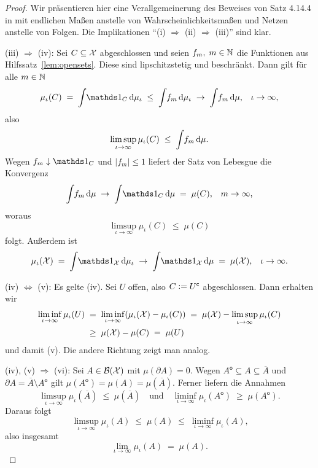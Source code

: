 \documentclass[../main/main.tex]{subfiles}
\begin{document}
	\begin{proof}
		Wir präsentieren hier eine Verallgemeinerung des Beweises von Satz 4.14.4 in \cite[Kapitel 4.14]{Simon.2015} mit endlichen Maßen 
		anstelle von Wahrscheinlichkeitsmaßen und Netzen anstelle von Folgen. Die Implikationen \enquote{(i) $\Rightarrow$ (ii) $\Rightarrow$ (iii)} sind klar. 
		
		(iii) $\Rightarrow$ (iv): Sei $C \subseteq \mathcal{X}$ abgeschlossen und seien 
		$f_m, \; m \in \mathbb{N}$ die Funktionen aus Hilfssatz~\ref{lem:opensets}. 
		Diese sind lipschitzstetig und beschränkt.
		Dann gilt für alle $m \in \mathbb{N}$
		$$\mu_\iota(C) \; = \; \measureint{}{\indfct_C}{\mu_\iota} \; \leq \; 
		\measureint{}{f_m}{\mu_\iota} \; \to \;
		\measureint{}{f_m}{\mu} \text{,} \quad \iota \to \infty \text{,}$$
		also 
		$$\limsup_{\iota \to \infty} \mu_\iota(C) \; \leq \; 
		\int_{} \, f_m \, \mathrm{d}\mu \text{.}$$
		Wegen $f_m \convdown \indfct_C$ und $| f_m | \leq 1$ 
		liefert der Satz von Lebesgue die Konvergenz
		$$\measureint{}{f_m}{\mu} \; \to \;
		\measureint{}{\indfct_C}{\mu} \; = \; \mu(C) \text{,} 
		\quad m \to \infty \text{,}$$
		woraus
		$$\limsup_{\iota \to \infty} \mu_\iota(C) \; \leq \; \mu(C)$$
		folgt. Außerdem ist 
		$$\mu_\iota(\X) \; = \; \measureint{}{\indfct_{\X}}{\mu_\iota} \; \to \; \measureint{}{\indfct_{\X}}{\mu} \; = \; \mu(\X) \text{,} 
		\quad \iota \to \infty \text{.}$$
		
		(iv) $\Leftrightarrow$ (v): Es gelte (iv). Sei $U$ offen, also 
		$C \vcentcolon = U^\mathsf{c}$ abgeschlossen. Dann erhalten wir
		\begin{align*}
			\liminf_{\iota \to \infty} \mu_\iota(U) \; &= \; \liminf_{\iota \to \infty} (\mu_\iota(\mathcal{X}) - \mu_\iota(C)) \; = \;
			\mu(\mathcal{X}) - \limsup_{\iota \to \infty} \mu_\iota(C) \\
			&\geq \; 
			\mu(\mathcal{X}) - \mu(C) \; = \; \mu(U)
		\end{align*}
		und damit (v). Die andere Richtung zeigt man analog.
		
		(iv), (v) $\Rightarrow$ (vi): Sei $A \in \mathcal{B}(\mathcal{X})$ mit 
		$\mu(\partial A) = 0$. Wegen
		$A^\mathsf{o} \subseteq A \subseteq \overline{A}$ und 
		$\partial A = \overline{A} \setminus A^\mathsf{o}$ gilt $\mu(A^\mathsf{o}) = 
		\mu(A) = \mu(\overline{A}) \text{.}$
		Ferner liefern die Annahmen
		$$\limsup_{\iota \to \infty} \mu_\iota(\overline{A}) \; \leq \; 
		\mu(\overline{A}) \quad \text{und} \quad 
		\liminf_{\iota \to \infty} \mu_\iota(A^\mathsf{o}) \; \geq \; 
		\mu(A^\mathsf{o}) \text{.}$$
		Daraus folgt
		$$\limsup_{\iota \to \infty} \mu_\iota(A) \; \leq \; 
		\mu(A) \; \leq \; \liminf_{\iota \to \infty} \mu_\iota(A) \text{,}$$
		also insgesamt
		$$\lim_{\iota \to \infty} \mu_\iota(A) \; = \; \mu(A) \text{.}$$
		

\end{proof}
\end{document}
